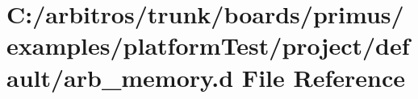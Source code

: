 \hypertarget{boards_2primus_2examples_2platform_test_2project_2default_2arb__memory_8d}{\section{C\-:/arbitros/trunk/boards/primus/examples/platform\-Test/project/default/arb\-\_\-memory.d File Reference}
\label{boards_2primus_2examples_2platform_test_2project_2default_2arb__memory_8d}
}
